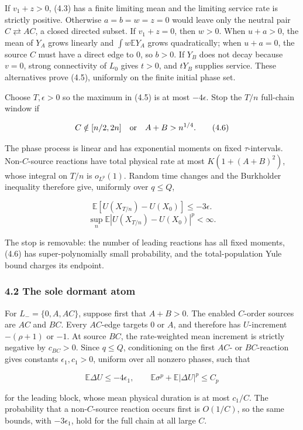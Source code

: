 If \(v_1+z>0\), (4.3) has a finite limiting mean and the limiting
service rate is strictly positive. Otherwise \(a=b=w=z=0\) would leave
only the neutral pair \(C\rightleftarrows AC\), a closed directed
subset. If \(v_1+z=0\), then \(w>0\). When \(u+a>0\), the mean of
\(Y_A\) grows linearly and \(\int w\mathbb EY_A\) grows quadratically;
when \(u+a=0\), the source \(C\) must have a direct edge to \(0\), so
\(b>0\). If \(Y_B\) does not decay because \(v=0\), strong connectivity
of \(L_0\) gives \(t>0\), and \(tY_B\) supplies service. These
alternatives prove (4.5), uniformly on the finite initial phase set.

Choose \(T,\epsilon>0\) so the maximum in (4.5) is at most
\(-4\epsilon\). Stop the \(T/n\) full-chain window if

\[
 C\notin[n/2,2n]\quad\hbox{or}\quad A+B>n^{1/4}.           \tag{4.6}
\]

The phase process is linear and has exponential moments on fixed
\(\tau\)-intervals. Non-\(C\)-source reactions have total physical rate
at most \(K(1+(A+B)^2)\), whose integral on \(T/n\) is \(o_{L^p}(1)\).
Random time changes and the Burkholder inequality therefore give,
uniformly over \(q\le Q\),

\[
 \mathbb E[U(X_{T/n})-U(X_0)]\le-3\epsilon.              \tag{4.7}
\] \[
 \sup_n\mathbb E|U(X_{T/n})-U(X_0)|^p<\infty.            \tag{4.8}
\]

The stop is removable: the number of leading reactions has all fixed
moments, (4.6) has super-polynomially small probability, and the
total-population Yule bound charges its endpoint.

\subsubsection{4.2 The sole dormant atom}

For \(L_-=\{0,A,AC\}\), suppose first that \(A+B>0\). The enabled
\(C\)-order sources are \(AC\) and \(BC\). Every \(AC\)-edge targets
\(0\) or \(A\), and therefore has \(U\)-increment \(-(\rho+1)\) or
\(-1\). At source \(BC\), the rate-weighted mean increment is strictly
negative by \(c_{BC}>0\). Since \(q\le Q\), conditioning on the first
\(AC\)- or \(BC\)-reaction gives constants \(\epsilon_1,c_1>0\), uniform
over all nonzero phases, such that

\[
 \mathbb E\Delta U\le-4\epsilon_1,\qquad
 \mathbb E\sigma^p+\mathbb E|\Delta U|^p\le C_p           \tag{4.9}
\]

for the leading block, whose mean physical duration is at most
\(c_1/C\). The probability that a non-\(C\)-source reaction occurs first
is \(O(1/C)\), so the same bounds, with \(-3\epsilon_1\), hold for the
full chain at all large \(C\).

